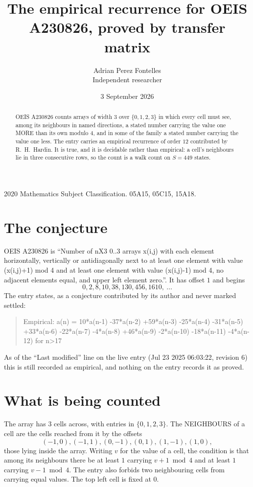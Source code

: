 \documentclass[11pt,a4paper]{article}
\title{The empirical recurrence for OEIS A230826, proved by transfer matrix}
\author{Adrian Perez Fontelles\\ \small Independent researcher}
\date{3 September 2026}
\theoremstyle{plain}
\theoremstyle{definition}
\begin{document}
\maketitle

\begin{abstract}
OEIS A230826 counts arrays of width $3$ over $\{0,1,2,3\}$ in which every cell must see, among its
neighbours in named directions, a stated number carrying the value one MORE than its own
modulo $4$, and in some of the family a stated number carrying the value one less. The entry
carries an empirical recurrence of order $12$ contributed by R.~H.~Hardin. It is true, and
it is decidable rather than empirical: a cell's neighbours lie in three consecutive rows, so
the count is a walk count on $S=449$ states.
\end{abstract}

\noindent\small 2020 Mathematics Subject Classification. 05A15, 05C15, 15A18.\normalsize

\section{The conjecture}

OEIS A230826 is ``Number of nX3 0..3 arrays x(i,j) with each element horizontally, vertically or antidiagonally next to at least one element with value (x(i,j)+1) mod 4 and at least one element with value (x(i,j)-1) mod 4, no adjacent elements equal, and upper left element zero.''. It has offset $1$ and begins
\[
0, 2, 8, 10, 38, 130, 456, 1610,\ \dots
\]
The entry states, as a conjecture contributed by its author and never marked settled:
\begin{quote}
Empirical: a(n) = 10*a(n-1) -37*a(n-2) +59*a(n-3) -25*a(n-4) -31*a(n-5) +33*a(n-6) -22*a(n-7) -4*a(n-8) +46*a(n-9) -2*a(n-10) -18*a(n-11) -4*a(n-12) for n>17
\end{quote}
As of the ``Last modified'' line on the live entry (Jul 23 2025 06:03:22, revision 6) this is still
recorded as empirical, and nothing on the entry records it as proved.

\section{What is being counted}

The array has $3$ cells across, with entries in $\{0,1,2,3\}$. The NEIGHBOURS of a cell are the
cells reached from it by the offsets
\[
(-1,0), (-1,1), (0,-1), (0,1), (1,-1), (1,0),
\]
those lying inside the array. Writing $v$ for the value of a cell, the condition is that among
its neighbours there be at least $1$ carrying $v+1 \bmod 4$ and at least $1$ carrying $v-1 \bmod 4$. The entry also forbids two neighbouring cells from carrying equal values. The top left
cell is fixed at $0$.
\end{document}
